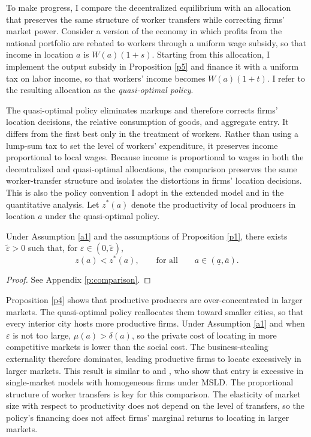 To make progress, I compare the decentralized equilibrium with an allocation that preserves the same structure of worker transfers while correcting firms’ market power. Consider a version of the economy in which profits from the national portfolio are rebated to workers through a uniform wage subsidy, so that income in location $a$ is $W(a)(1+s)$. Starting from this allocation, I implement the output subsidy in Proposition \ref{p5} and finance it with a uniform tax on labor income, so that workers’ income becomes $W(a)(1+t)$. I refer to the resulting allocation as the \textit{quasi-optimal policy}.

The quasi-optimal policy eliminates markups and therefore corrects firms’ location decisions, the relative consumption of goods, and aggregate entry. It differs from the first best only in the treatment of workers. Rather than using a lump-sum tax to set the level of workers’ expenditure, it preserves income proportional to local wages. Because income is proportional to wages in both the decentralized and quasi-optimal allocations, the comparison preserves the same worker-transfer structure and isolates the distortions in firms’ location decisions. This is also the policy convention I adopt in the extended model and in the quantitative analysis. Let $z^*(a)$ denote the productivity of local producers in location $a$ under the quasi-optimal policy.

\begin{prop}\label{p4}
Under Assumption \ref{a1} and the assumptions of Proposition \ref{p1}, there exists $\widetilde{\varepsilon} > 0$ such that, for $\varepsilon \in (0, \widetilde{\varepsilon})$,
\begin{equation}\label{eq:prodsp}
z(a) < z^*(a), \qquad \text{for all} \qquad a \in (\underline{a}, \overline{a}).
\end{equation}
\end{prop}

\begin{proof}
See Appendix \ref{p:comparison}.
\end{proof}

Proposition \ref{p4} shows that productive producers are over-concentrated in larger markets. The quasi-optimal policy reallocates them toward smaller cities, so that every interior city hosts more productive firms. Under Assumption \ref{a1} and when $\varepsilon$ is not too large, $\mu(a) > \delta(a)$, so the private cost of locating in more competitive markets is lower than the social cost. The business-stealing externality therefore dominates, leading productive firms to locate excessively in larger markets. This result is similar to \textcite{Dhingra&Morrow19} and \textcite{Matsuyama&Ushev21}, who show that entry is excessive in single-market models with homogeneous firms under MSLD. The proportional structure of worker transfers is key for this comparison. The elasticity of market size with respect to productivity does not depend on the level of transfers, so the policy’s financing does not affect firms’ marginal returns to locating in larger markets.


